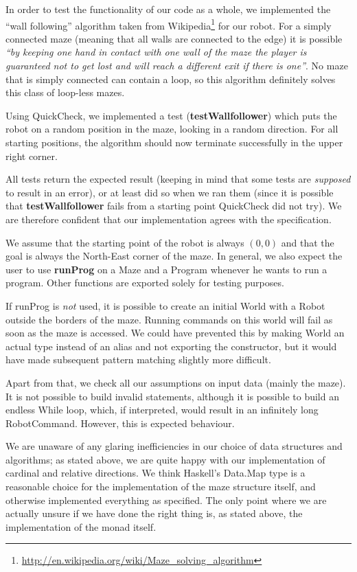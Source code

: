 \documentclass[a4paper]{article}
\begin{document}
In order to test the functionality of our code as a whole, we implemented the ``wall following'' algorithm taken from
Wikipedia\footnote{\url{http://en.wikipedia.org/wiki/Maze_solving_algorithm}} for our robot.
For a simply connected maze (meaning that all walls are
connected to the edge) it is possible \emph{``by keeping one hand in
  contact with one wall of the maze the player is guaranteed not to
  get lost and will reach a different exit if there is one''}. No maze
that is simply connected can contain a loop, so this algorithm
definitely solves this class of loop-less mazes. 

Using QuickCheck, we implemented a test (\textbf{testWallfollower}) which puts the robot on a random position in the maze, looking in a random direction. For all starting positions, the algorithm should now terminate successfully in the upper right corner. 

All tests return the expected result (keeping in mind that some tests are \emph{supposed} to result in an error), or at least did so when we ran them (since it is possible that \textbf{testWallfollower} fails from a starting point QuickCheck did not try). We are therefore confident that our implementation agrees with the specification.

We assume that the starting point of the robot is always $(0,0)$ and that the goal is always the North-East corner of the maze. In general, we also expect the user to use \textbf{runProg} on a Maze and a Program whenever he wants to run a program. Other functions are exported solely for testing purposes. 

If runProg is \emph{not} used, it is possible to create an initial World with a Robot outside the borders of the maze. Running commands on this world will fail as soon as the maze is accessed. We could have prevented this by making World an actual type instead of an alias and not exporting the constructor, but it would have made subsequent pattern matching slightly more difficult.

Apart from that, we check all our assumptions on input data (mainly the maze). It is not possible to build invalid statements, although it is possible to build an endless While loop, which, if interpreted, would result in an infinitely long RobotCommand. However, this is expected behaviour.

We are unaware of any glaring inefficiencies in our choice of data structures and algorithms; as stated above, we are quite happy with our implementation of cardinal and relative directions. We think Haskell's Data.Map type is a reasonable choice for the implementation of the maze structure itself, and otherwise implemented everything as specified. The only point where we are actually unsure if we have done the right thing is, as stated above, the implementation of the monad itself. 
\end{document}
